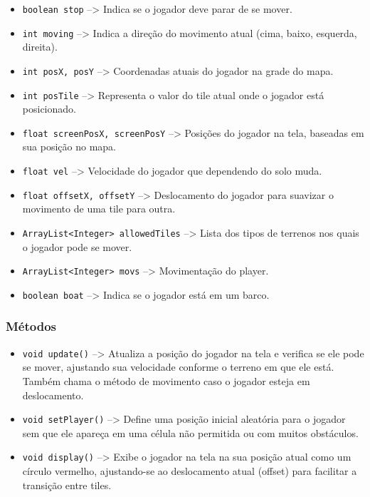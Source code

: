 \documentclass[
	12pt,				%
	oneside,			%
	a4paper,			%
	english,			%
	brazil,				%
	]{abntex2}
\begin{document}
{\begin{itemize}
    \item \texttt{boolean stop} --> Indica se o jogador deve parar de se mover.
    \item \texttt{int moving} --> Indica a direção do movimento atual (cima, baixo, esquerda, direita).
    \item \texttt{int posX, posY} --> Coordenadas atuais do jogador na grade do mapa.
    \item \texttt{int posTile} --> Representa o valor do tile atual onde o jogador está posicionado.
    \item \texttt{float screenPosX, screenPosY} --> Posições do jogador na tela, baseadas em sua posição no mapa.
    \item \texttt{float vel} --> Velocidade do jogador que dependendo do solo muda.
    \item \texttt{float offsetX, offsetY} --> Deslocamento do jogador para suavizar o movimento de uma tile para outra.
    \item \texttt{ArrayList<Integer> allowedTiles} --> Lista dos tipos de terrenos nos quais o jogador pode se mover.
    \item \texttt{ArrayList<Integer> movs} --> Movimentação do player.
    \item \texttt{boolean boat} --> Indica se o jogador está em um barco.
\end{itemize}

\subsubsection{Métodos}

\begin{itemize}
    \item \texttt{void update()} --> Atualiza a posição do jogador na tela e verifica se ele pode se mover, ajustando sua velocidade conforme o terreno em que ele está. Também chama o método de movimento caso o jogador esteja em deslocamento.
    
    \item \texttt{void setPlayer()} --> Define uma posição inicial aleatória para o jogador sem que ele apareça em uma célula não permitida ou com muitos obstáculos.
    
    \item \texttt{void display()} --> Exibe o jogador na tela na sua posição atual como um círculo vermelho, ajustando-se ao deslocamento atual (offset) para facilitar a transição entre tiles.
    

\end{itemize}}
\end{document}
